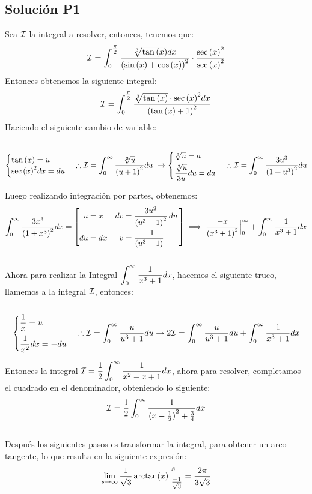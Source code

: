 
\begin{CajaTitulo}{\begin{center}\subsection{Solución P1}\end{center}}
\vspace{1cm}
    Sea $\I$ la integral a resolver, entonces, tenemos que: \[ \I =  \int_{0}^{\mathlarger{\frac{\pi}{2}}}\frac{\sqrt[3]{\tan{(x)}}dx}{{(\sin{(x)}+\cos{(x)})}^2} \cdot \frac{\sec{(x)}^2}{\sec{(x)}^2}\]
    Entonces obtenemos la siguiente integral: \[\I =  \int_{0}^{\mathlarger{\frac{\pi}{2}}}\frac{\sqrt[3]{\tan{(x)}}\cdot \sec{(x)}^2 dx}{{(\tan{(x)}+1)}^2}\]
    Haciendo el siguiente cambio de variable: \\ \\

    \[\cambio{\tan{(x)} = u}{\sec{(x)}^2 dx = du}  \Porlo \I = \int_{0}^{\infty}\frac{\sqrt[3]{u}}{{(u+1)}^2} du  \hspace{0.1cm} \rightarrow \cambio{\sqrt[3]{u} = a \vspace{0.1cm}}{\mathlarger{\frac{\sqrt[3]{u}}{3u}}du = da} \Porlo\I = \int_{0}^{\infty}\frac{3u^3}{{(1+u^3)}^2}du\]


    Luego realizando integración por partes, obtenemos: \[ \int_{0}^{\infty}\frac{3x^3}{{(1+x^3)}^2}dx = \PorPartes{x}{\diff x}{\frac{3u^2}{{(u^3+1)}^2}\diff u}{\frac{-1}{(u^3 +1)}} \implies \frac{-x}{{(x^3+1)}^2} \Brackets_0^\infty  + \int_{0}^{\infty} \frac{1}{x^3 + 1}dx \] \\

    Ahora para realizar la Integral $\mathlarger{\int_{0}^{\infty} \frac{1}{x^3 + 1}dx}$, hacemos el siguiente truco, llamemos a la integral $\I$, entonces: \\ \\

    \[\cambio{\mathlarger{\frac{1}{x}} = u \vspace{0.2cm}}{\mathlarger{\frac{1}{x^2}dx}= -du} \Porlo \I = \int_{0}^{\infty}\frac{u}{u^3 +1}du \rightarrow 2\I = \int_{0}^{\infty}\frac{u}{u^3 +1}du + \int_{0}^{\infty} \frac{1}{x^3 + 1}dx\]

    Entonces la integral $\I = \mathlarger{\frac{1}{2}\int_{0}^{\infty}\frac{1}{x^2 -x +1}dx}$, ahora para resolver, completamos el cuadrado en el denominador, obteniendo lo siguiente: \[ \I = \frac{1}{2}\int_{0}^{\infty}\frac{1}{{(x-\frac{1}{2})}^2 + \frac{3}{4}}dx \] \\

    Después los siguientes pasos es transformar la integral, para obtener un arco tangente, lo que resulta en la siguiente expresión: \\


    \[\lim_{s \to \infty}  \frac{1}{\sqrt{3}} \arctan(x) \Brackets_\mathlarger{\frac{-1}{\sqrt{3}}} ^\mathlarger{s} = \frac{2\pi}{3\sqrt{3}}   \]

    \vspace{2cm}
\end{CajaTitulo}